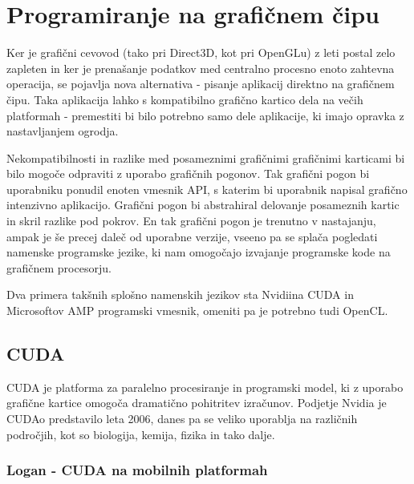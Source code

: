 \chapter{Programiranje na grafičnem čipu}


Ker je grafični cevovod (tako pri Direct3D, kot pri OpenGLu) z leti postal zelo zapleten in ker je prenašanje podatkov med centralno procesno enoto zahtevna operacija, se pojavlja nova alternativa - pisanje aplikacij direktno na grafičnem čipu. Taka aplikacija lahko s kompatibilno grafično kartico dela na večih platformah - premestiti bi bilo potrebno samo dele aplikacije, ki imajo opravka z nastavljanjem ogrodja. 

Nekompatibilnosti in razlike med posameznimi grafičnimi grafičnimi karticami bi bilo mogoče odpraviti z uporabo grafičnih pogonov. Tak grafični pogon bi uporabniku ponudil enoten vmesnik API, s katerim bi uporabnik napisal grafično intenzivno aplikacijo. Grafični pogon bi abstrahiral delovanje posameznih kartic in skril razlike pod pokrov. En tak grafični pogon je trenutno v nastajanju, ampak je še precej daleč od uporabne verzije, vseeno pa se splača pogledati namenske programske jezike, ki nam omogočajo izvajanje programske kode na grafičnem procesorju.

Dva primera takšnih splošno namenskih jezikov sta Nvidiina CUDA in Microsoftov AMP programski vmesnik, omeniti pa je potrebno tudi OpenCL.

\section{CUDA}
CUDA \cite{cuda} je platforma za paralelno procesiranje in programski model, ki z uporabo grafične kartice omogoča dramatično pohitritev izračunov. Podjetje Nvidia je CUDAo predstavilo leta 2006, danes pa se veliko uporablja na različnih področjih, kot so biologija, kemija, fizika in tako dalje.

\subsection{Logan - CUDA na mobilnih platformah}

